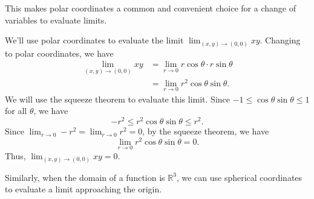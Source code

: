 \documentclass{ximera}
\begin{document}
\begin{image}
\end{image}

This makes polar coordinates a common and convenient choice for a change of variables to evaluate limits.

\begin{example}
We'll use polar coordinates to evaluate the limit $\lim_{(x,y)\rightarrow (0,0)}xy$. Changing to polar coordinates, we have
\begin{align*}
\lim_{(x,y)\rightarrow (0,0)}xy &= \lim_{r\rightarrow 0} r\cos\theta \cdot r\sin\theta\\
&= \lim_{r\rightarrow 0} r^2\cos\theta\sin\theta.
\end{align*}
We will use the squeeze theorem to evaluate this limit. Since $-1\leq\cos\theta\sin\theta\leq 1$ for all $\theta$, we have
\[
-r^2\leq r^2\cos\theta\sin\theta\leq r^2.
\]
Since $\lim_{r\rightarrow 0} -r^2 = \lim_{r\rightarrow 0} r^2=0$, by the squeeze theorem, we have
\[
\lim_{r\rightarrow 0} r^2\cos\theta\sin\theta = 0.
\]
Thus, $\lim_{(x,y)\rightarrow (0,0)}xy = 0$.
\end{example}

Similarly, when the domain of a function is $\mathbb{R}^3$, we can use spherical coordinates to evaluate a limit approaching the origin.
\end{document}
